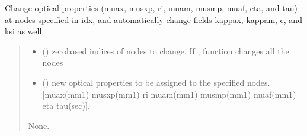 \documentclass[letterpaper,10pt,english]{sphinxmanual}
\begin{document}
\begin{fulllineitems}
\begin{fulllineitems}
\label{\detokenize{_autosummary/nirfasterff.base.fluor_mesh.fluormesh:nirfasterff.base.fluor_mesh.fluormesh.change_prop}}
\pysigstartsignatures
{}
\pysigstopsignatures
\sphinxAtStartPar
Change optical properties (muax, musxp, ri, muam, musmp, muaf, eta, and tau) at nodes specified in idx, and automatically change fields kappax, kappam, c, and ksi as well
\begin{quote}\begin{description}
\begin{itemize}
\item {} 
\sphinxAtStartPar
{} () \textendash{} zero\sphinxhyphen{}based indices of nodes to change. If , function changes all the nodes

\item {} 
\sphinxAtStartPar
{} () \textendash{} new optical properties to be assigned to the specified nodes. {[}muax(mm\sphinxhyphen{}1) musxp(mm\sphinxhyphen{}1) ri muam(mm\sphinxhyphen{}1) musmp(mm\sphinxhyphen{}1) muaf(mm\sphinxhyphen{}1) eta tau(sec){]}.

\end{itemize}

\sphinxAtStartPar
None.

\end{description}\end{quote}

\end{fulllineitems}



\end{fulllineitems}
\end{document}
